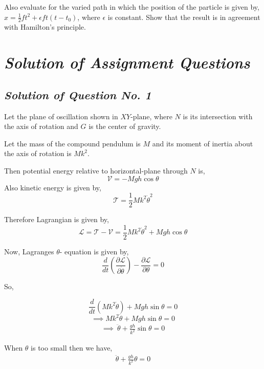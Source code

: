 \documentclass[12pt, a4paper]{article} %
\begin{document}
\begin{enumerate}
    Also evaluate for the varied path in which the position of the particle is given by, $\displaystyle x = \frac{1}{2}ft^2 + \epsilon f t\left(t-t_0\right)$, where $\displaystyle \epsilon$ is constant. Show that the result is in agreement with Hamilton's principle.
\end{enumerate}

\pagebreak

\section{\slshape Solution of Assignment Questions}

\subsection{\slshape Solution of Question No. 1}

Let the plane of oscillation shown in $XY\mbox{-plane}$, where $N$ is its intersection with the axis of rotation and $G$ is the center of gravity.


\begin{center}
    \def\svgwidth{10cm}
    
\end{center}


Let the mass of the compound pendulum is $M$ and its moment of inertia about the axis of rotation is $Mk^2$.

Then potential energy relative to horizontal-plane through $N$ is,
\[\mathcal{V} = -Mgh\cos \theta\]
Also kinetic energy is given by,
\[\mathcal{T} = \frac{1}{2}Mk^2 \dot{\theta}^2\]

Therefore Lagrangian is given by,
\begin{equation*}
    \mathscr{L} = \mathcal{T - V} = \frac{1}{2}Mk^2 \dot{\theta}^2 + Mgh\cos \theta
\end{equation*}

Now, Lagranges $\theta$- equation is given by,
\[\frac{d}{dt}\left(\frac{\partial \mathscr{L}}{\partial \dot{\theta}}\right) - \frac{\partial \mathscr{L}}{\partial \theta} = 0\]

So, 

 \[\frac{d}{dt}\left(Mk^2 \dot{\theta}\right) + Mgh \sin\theta = 0 \]
\[\implies Mk^2\ddot{\theta} + Mgh\sin\theta = 0\]
\begin{align*}
    \implies\ \boxed{\ddot{\theta} + \frac{gh}{k^2}\sin\theta = 0}
\end{align*}

When $\theta$ is too small then we have,
\begin{align*}
    \boxed{\ddot{\theta} + \frac{gh}{k^2}\theta = 0}
\end{align*}
\end{document}
